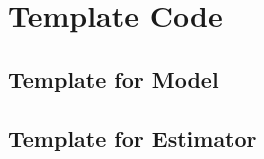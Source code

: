 \section{Template Code}
\subsection{Template for Model}

\clearpage
\subsection{Template for Estimator}

